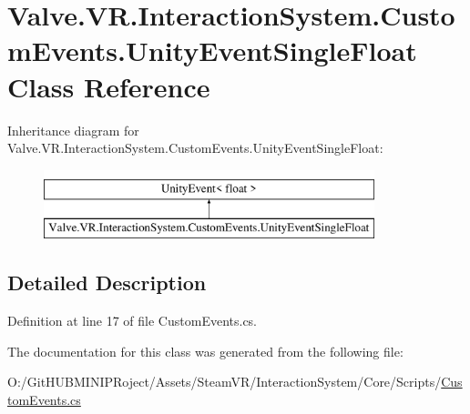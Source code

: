 \hypertarget{class_valve_1_1_v_r_1_1_interaction_system_1_1_custom_events_1_1_unity_event_single_float}{}\section{Valve.\+V\+R.\+Interaction\+System.\+Custom\+Events.\+Unity\+Event\+Single\+Float Class Reference}
\label{class_valve_1_1_v_r_1_1_interaction_system_1_1_custom_events_1_1_unity_event_single_float}
Inheritance diagram for Valve.\+V\+R.\+Interaction\+System.\+Custom\+Events.\+Unity\+Event\+Single\+Float\+:\begin{figure}[H]
\begin{center}
\leavevmode
\includegraphics[height=2.000000cm]{class_valve_1_1_v_r_1_1_interaction_system_1_1_custom_events_1_1_unity_event_single_float}
\end{center}
\end{figure}


\subsection{Detailed Description}


Definition at line 17 of file Custom\+Events.\+cs.



The documentation for this class was generated from the following file\+:\begin{DoxyCompactItemize}
\item 
O\+:/\+Git\+H\+U\+B\+M\+I\+N\+I\+P\+Roject/\+Assets/\+Steam\+V\+R/\+Interaction\+System/\+Core/\+Scripts/\mbox{\hyperlink{_custom_events_8cs}{Custom\+Events.\+cs}}\end{DoxyCompactItemize}
